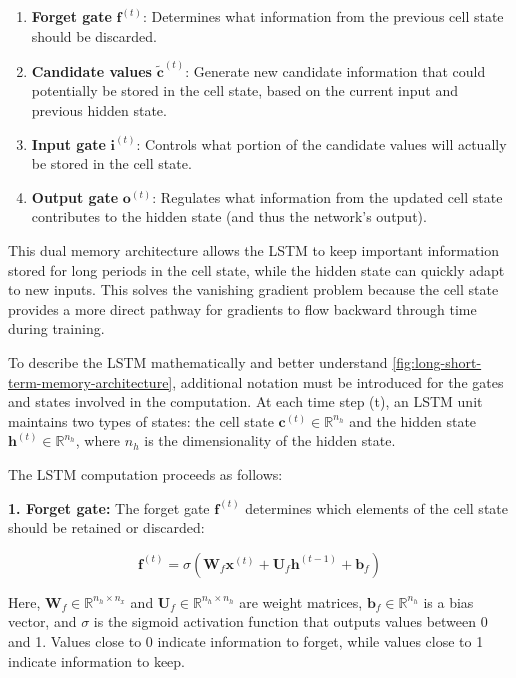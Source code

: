 \begin{enumerate}
  \item \textbf{Forget gate} \(\mathbf{f}^{(t)}\): Determines what information from the previous cell state should be discarded.
  \item \textbf{Candidate values} \(\mathbf{\tilde{c}}^{(t)}\): Generate new candidate information that could potentially be stored in the cell state, based on the current input and previous hidden state.
  \item \textbf{Input gate} \(\mathbf{i}^{(t)}\): Controls what portion of the candidate values will actually be stored in the cell state.
  \item \textbf{Output gate} \(\mathbf{o}^{(t)}\): Regulates what information from the updated cell state contributes to the hidden state (and thus the network's output).
\end{enumerate}



This dual memory architecture allows the LSTM to keep important information stored for long periods in the cell state, while the hidden state can quickly adapt to new inputs. This solves the vanishing gradient problem because the cell state provides a more direct pathway for gradients to flow backward through time during training.

To describe the LSTM mathematically and better understand \autoref{fig:long-short-term-memory-architecture}, additional notation must be introduced for the gates and states involved in the computation. At each time step (t), an LSTM unit maintains two types of states: the cell state \(\mathbf{c}^{(t)} \in \mathbb{R}^{n_h}\) and the hidden state \(\mathbf{h}^{(t)} \in \mathbb{R}^{n_h}\), where \(n_h\) is the dimensionality of the hidden state.

The LSTM computation proceeds as follows:

\textbf{1. Forget gate:} The forget gate \(\mathbf{f}^{(t)}\) determines which elements of the cell state should be retained or discarded:

\[
  \mathbf{f}^{(t)} = \sigma(\mathbf{W}_f\mathbf{x}^{(t)} + \mathbf{U}_f\mathbf{h}^{(t-1)} + \mathbf{b}_f)
\]

Here, \(\mathbf{W}_f \in \mathbb{R}^{n_h \times n_x}\) and \(\mathbf{U}_f \in \mathbb{R}^{n_h \times n_h}\) are weight matrices, \(\mathbf{b}_f \in \mathbb{R}^{n_h}\) is a bias vector, and \(\sigma\) is the sigmoid activation function that outputs values between 0 and 1. Values close to 0 indicate information to forget, while values close to 1 indicate information to keep.

